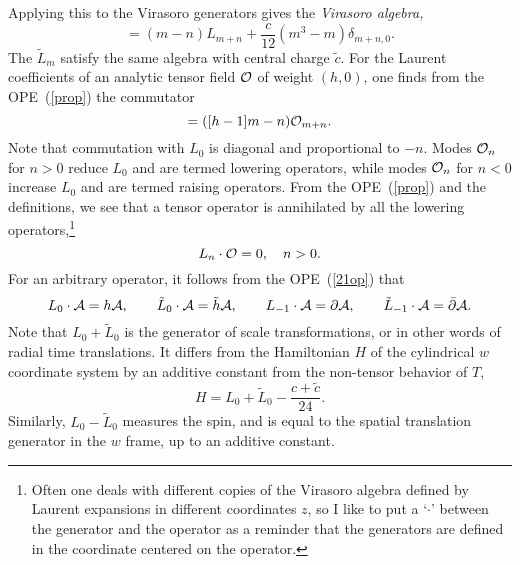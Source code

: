 Applying this to the Virasoro generators gives the {\it Virasoro
algebra,}
\begin{equation}
[L_m, L_n] = (m-n) L_{m+n} + \frac{c}{12} (m^3 - m) \delta_{m+n,0}.
\label{vira}
\end{equation}
The $\tilde L_m$ satisfy the same algebra with central charge
$\tilde c$.  For the Laurent coefficients of an analytic tensor
field
${\cal O}$ of weight 
$(h,0)$, one finds from the OPE~(\ref{prop}) the commutator
\begin{equation}
[L_m, {\cal O}_n] = ([h-1]m-n) {\cal O}_{m+n}.
\end{equation}
Note that commutation with $L_0$ is diagonal and proportional to
$-n$.  Modes ${\cal O}_n$ for $n > 0$ reduce $L_0$ and are termed
lowering operators, while modes ${\cal O}_n$ for $n < 0$ increase
$L_0$ and are termed raising operators.  From the OPE~(\ref{prop})
and the definitions, we see that a tensor operator is annihilated
by all the lowering operators,\footnote
{Often one deals with different copies of the Virasoro algebra
defined by Laurent expansions in different coordinates $z$, so
I like to put a `$\cdot$' between the generator and the operator
as a reminder that the generators are defined in the coordinate
centered on the operator.}
\begin{equation}
L_n \cdot {\cal O} = 0,\quad n > 0.
\end{equation}
For an arbitrary operator, it follows from the OPE~(\ref{21op})
that
\begin{equation}
L_0 \cdot {\cal A} = h {\cal A}, \qquad
\tilde L_0 \cdot {\cal A} = \tilde h {\cal A}, \qquad
L_{-1} \cdot {\cal A} = \partial {\cal A}, \qquad
\tilde L_{-1} \cdot {\cal A} = \bar\partial {\cal A}. \label{l01}
\end{equation}
Note that $L_0 + \tilde L_0$ is the generator of scale
transformations, or in other words of radial
time translations.  It differs from the Hamiltonian $H$ of the
cylindrical $w$ coordinate system by an additive constant from the
non-tensor behavior of $T$,
\begin{equation}
H = L_0 + \tilde L_0 -\frac{c + \tilde c}{24}. \label{canon}
\end{equation}
Similarly, $L_0 - \tilde L_0$ measures the spin, and is equal to
the spatial translation generator in the $w$ frame, up to an
additive constant.

